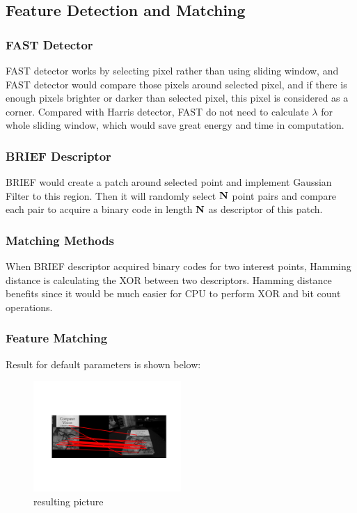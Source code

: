 \documentclass[11pt]{article} \usepackage{fullpage} \usepackage{graphicx} \usepackage{epstopdf} \usepackage{color} \usepackage{psfrag} \usepackage{pdfsync}\usepackage{indentfirst}\usepackage{subfigure}\usepackage{float}\usepackage[section]{placeins}
\begin{document}
\subsection{Feature Detection and Matching}

\setcounter{subsubsection}{0}
\subsubsection{FAST Detector}

FAST detector works by selecting pixel rather than using sliding window, and FAST detector would compare those pixels around selected pixel, and if there is enough pixels brighter or darker than selected pixel, this pixel is considered as a corner. Compared with Harris detector, FAST do not need to calculate $\lambda$ for whole sliding window, which would save great energy and time in computation.

\subsubsection{BRIEF Descriptor}

BRIEF would create a patch around selected point and implement Gaussian Filter to this region. Then it will randomly select $\bold{N}$ point pairs and compare each pair to acquire a binary code in length $\bold{N}$ as descriptor of this patch.

\subsubsection{Matching Methods}

When BRIEF descriptor acquired binary codes for two interest points, Hamming distance is calculating the XOR between two descriptors. Hamming distance benefits since it would be much easier for CPU to perform XOR and bit count operations.

\subsubsection{Feature Matching}

Result for default parameters is shown below:
\begin{figure}[H]
\centering
\includegraphics[width=0.5\textwidth]{results/q2_1_4_de.png}
\caption{resulting picture}
\end{figure}
\end{document}
